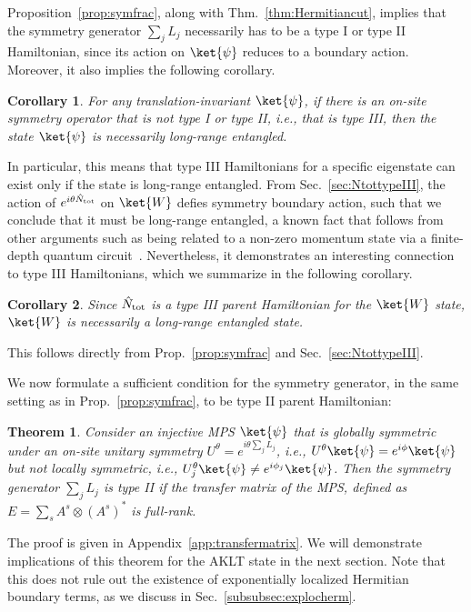\documentclass[prx,letterpaper,aps,superscriptaddress,floatfix,twocolumn,nofootinbib]{revtex4-2}
\newtheorem{thm}{Theorem}
\newtheorem{cor}{Corollary}
\theoremstyle{definition}
\begin{document}
%
Proposition~\ref{prop:symfrac}, along with Thm.~\ref{thm:Hermitiancut}, implies that the symmetry generator $\sum_j L_j$ necessarily has to be a type I or type II Hamiltonian, since its action on $\ket{\psi}$ reduces to a boundary action.
%
Moreover, it also implies the following corollary. 
%
\begin{cor}
For any translation-invariant $\ket{\psi}$, if there is an on-site symmetry operator that is not type I or type II, i.e., that is type III, then the state $\ket{\psi}$ is necessarily long-range entangled.
%
\end{cor}
%
In particular, this means that type III Hamiltonians for a specific eigenstate can exist only if the state is long-range entangled.
%
From Sec.~\ref{sec:NtottypeIII}, the action of $e^{i\theta\hat{N}_{\rm tot}}$ on $\ket{W}$ defies symmetry boundary action, such that we conclude that it must be long-range entangled, a known fact that follows from other arguments such as being related to a non-zero momentum state via a finite-depth quantum circuit~\cite{PhysRevX.12.031007}.
%
Nevertheless, it demonstrates an interesting connection to type III Hamiltonians, which we summarize in the following corollary.
\begin{cor}
    Since $\hat{N}_{\rm tot}$ is a type III parent Hamiltonian for the $\ket{W}$ state, $\ket{W}$ is necessarily a long-range entangled state.
\end{cor}
This follows directly from Prop.~\ref{prop:symfrac} and Sec.~\ref{sec:NtottypeIII}.
%

%
We now formulate a sufficient condition for the symmetry generator, in the same setting as in Prop.~\ref{prop:symfrac}, to be type II parent Hamiltonian:
\begin{thm}\label{thm:transfermat}
    Consider an injective MPS $\ket{\psi}$ that is globally symmetric under an on-site unitary symmetry $U^\theta = e^{i\theta \sum_j{L_j}}$, i.e., $U^\theta\ket{\psi} = e^{i\phi}\ket{\psi}$ but not locally symmetric, i.e., $U^\theta_j\ket{\psi} \neq e^{i\phi_j} \ket{\psi}$.
    Then the symmetry generator $\sum_j{L_j}$ is type II if the transfer matrix of the MPS, defined as $E = \sum_{s}{A^s \otimes (A^s)^\ast}$ is full-rank.
\end{thm}
%
The proof is given in Appendix~\ref{app:transfermatrix}. 
%
We will demonstrate implications of this theorem for the AKLT state in the next section.
%
Note that this does not rule out the existence of exponentially localized Hermitian boundary terms, as we discuss in Sec.~\ref{subsubsec:explocherm}.
%
\end{document}
